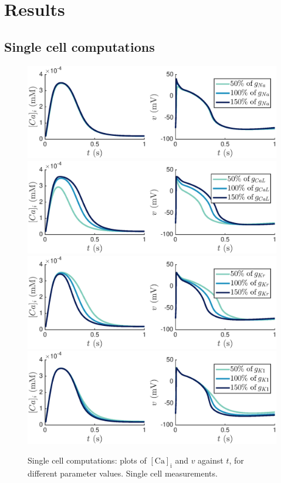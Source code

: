 \documentclass{article}
\begin{document}
%
\section{Results} \label{Results}
\subsection{Single cell computations} \label{Single cell computations}
%
\begin{figure}
   \includegraphics[trim=0cm 0cm 0cm 0cm, clip=true, width=1\linewidth]{sc_gna} 
   \includegraphics[trim=0cm 0cm 0cm 0cm, clip=true, width=1\linewidth]{sc_gcal} 
      \includegraphics[trim=0cm 0cm 0cm 0cm, clip=true, width=1\linewidth]{sc_gkr} 
         \includegraphics[trim=0cm 0cm 0cm 0cm, clip=true, width=1\linewidth]{sc_gk1} 
    \caption{Single cell computations: plots of $[\mathrm{Ca}]_{\mathrm{i}}$ and $v$  against $t$, for different parameter values. Single cell measurements.}
    \label{fig:4a}
\end{figure}
\end{document}
